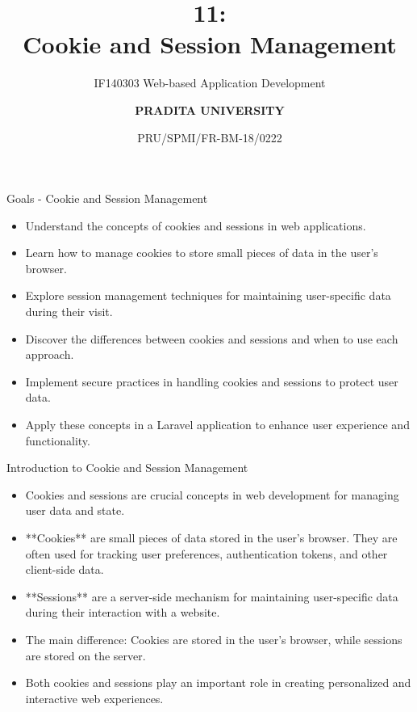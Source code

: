 \documentclass[aspectratio=169, table]{beamer}
\subtitle{IF140303 Web-based Application Development}
\title{\Huge {\textbf{11: \\Cookie and Session Management}}}
\date[Serial]{\scriptsize {PRU/SPMI/FR-BM-18/0222}}
\author[Pradita]{\small {\textbf{PRADITA UNIVERSITY}}}
\begin{document}
\begin{frame}
    \titlepage
\end{frame}

\begin{frame}{Goals - Cookie and Session Management}
\vskip1cm
    \begin{itemize}
        \item Understand the concepts of cookies and sessions in web applications.
        \item Learn how to manage cookies to store small pieces of data in the user's browser.
        \item Explore session management techniques for maintaining user-specific data during their visit.
        \item Discover the differences between cookies and sessions and when to use each approach.
        \item Implement secure practices in handling cookies and sessions to protect user data.
        \item Apply these concepts in a Laravel application to enhance user experience and functionality.
    \end{itemize}
\end{frame}

\begin{frame}{Introduction to Cookie and Session Management}
    \vskip1cm
    \begin{itemize}
        \item Cookies and sessions are crucial concepts in web development for managing user data and state.
        \item **Cookies** are small pieces of data stored in the user's browser. They are often used for tracking user preferences, authentication tokens, and other client-side data.
        \item **Sessions** are a server-side mechanism for maintaining user-specific data during their interaction with a website.
        \item The main difference: Cookies are stored in the user's browser, while sessions are stored on the server.
        \item Both cookies and sessions play an important role in creating personalized and interactive web experiences.
    \end{itemize}
\end{frame}
\end{document}
